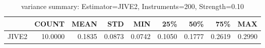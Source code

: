 \begin{table}[ht]
\centering
\caption{variance summary: Estimator=JIVE2, Instruments=200, Strength=0.10}
\begin{tabular}{lrrrrrrrr}
\toprule
 & COUNT & MEAN & STD & MIN & 25\% & 50\% & 75\% & MAX \\
\midrule
JIVE2 & 10.0000 & 0.1835 & 0.0873 & 0.0742 & 0.1050 & 0.1777 & 0.2619 & 0.2990 \\
\bottomrule
\end{tabular}
\end{table}
